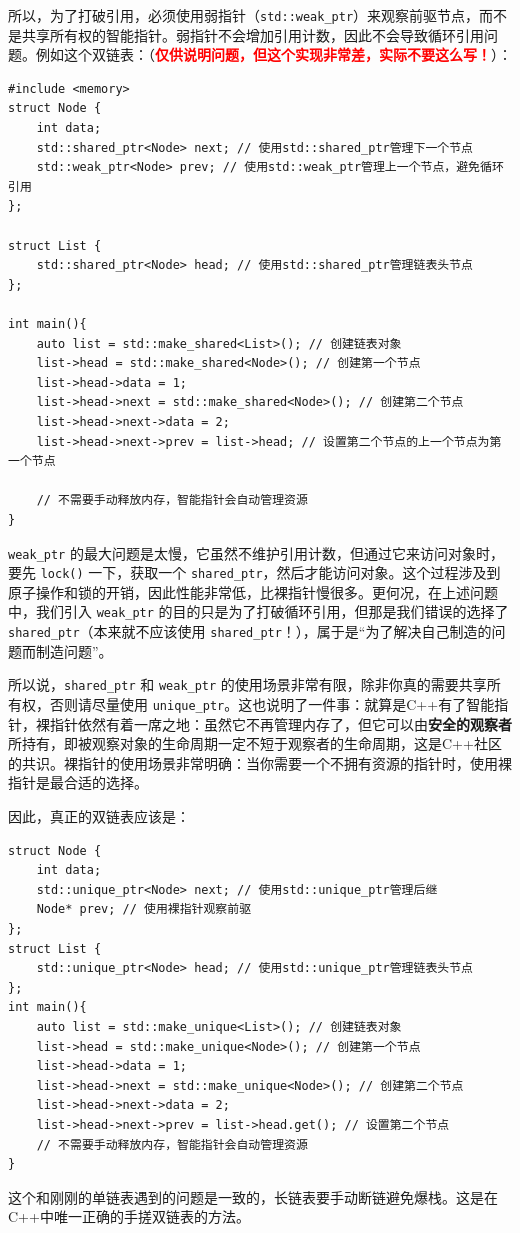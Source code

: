所以，为了打破引用，必须使用弱指针（\verb|std::weak_ptr|）来观察前驱节点，而不是共享所有权的智能指针。弱指针不会增加引用计数，因此不会导致循环引用问题。例如这个双链表：（\textcolor{red}{\bfseries 仅供说明问题，但这个实现非常差，实际不要这么写！}）：
\begin{verbatim}
#include <memory>
struct Node {
    int data;
    std::shared_ptr<Node> next; // 使用std::shared_ptr管理下一个节点
    std::weak_ptr<Node> prev; // 使用std::weak_ptr管理上一个节点，避免循环引用
};

struct List {
    std::shared_ptr<Node> head; // 使用std::shared_ptr管理链表头节点
};

int main(){
    auto list = std::make_shared<List>(); // 创建链表对象
    list->head = std::make_shared<Node>(); // 创建第一个节点
    list->head->data = 1;
    list->head->next = std::make_shared<Node>(); // 创建第二个节点
    list->head->next->data = 2;
    list->head->next->prev = list->head; // 设置第二个节点的上一个节点为第一个节点

    // 不需要手动释放内存，智能指针会自动管理资源
}
\end{verbatim}

\verb|weak_ptr| 的最大问题是太慢，它虽然不维护引用计数，但通过它来访问对象时，要先 \verb|lock()| 一下，获取一个 \verb|shared_ptr|，然后才能访问对象。这个过程涉及到原子操作和锁的开销，因此性能非常低，比裸指针慢很多。更何况，在上述问题中，我们引入 \verb|weak_ptr| 的目的只是为了打破循环引用，但那是我们错误的选择了 \verb|shared_ptr|（本来就不应该使用 \verb|shared_ptr|！），属于是“为了解决自己制造的问题而制造问题”。

所以说，\verb|shared_ptr| 和 \verb|weak_ptr| 的使用场景非常有限，除非你真的需要共享所有权，否则请尽量使用 \verb|unique_ptr|。这也说明了一件事：就算是C++有了智能指针，裸指针依然有着一席之地：虽然它不再管理内存了，但它可以由\textbf{安全的观察者}所持有，即被观察对象的生命周期一定不短于观察者的生命周期，这是C++社区的共识。裸指针的使用场景非常明确：当你需要一个不拥有资源的指针时，使用裸指针是最合适的选择。

因此，真正的双链表应该是：
\begin{verbatim}
struct Node {
    int data;
    std::unique_ptr<Node> next; // 使用std::unique_ptr管理后继
    Node* prev; // 使用裸指针观察前驱
};
struct List {
    std::unique_ptr<Node> head; // 使用std::unique_ptr管理链表头节点
};
int main(){
    auto list = std::make_unique<List>(); // 创建链表对象
    list->head = std::make_unique<Node>(); // 创建第一个节点
    list->head->data = 1;
    list->head->next = std::make_unique<Node>(); // 创建第二个节点
    list->head->next->data = 2;
    list->head->next->prev = list->head.get(); // 设置第二个节点
    // 不需要手动释放内存，智能指针会自动管理资源
}
\end{verbatim}
这个和刚刚的单链表遇到的问题是一致的，长链表要手动断链避免爆栈。这是在C++中唯一正确的手搓双链表的方法。


